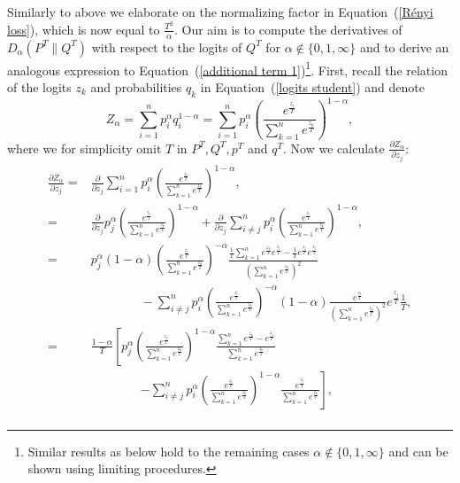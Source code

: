 \begin{rem}
    Similarly to above we elaborate on the normalizing factor in Equation~(\ref{Rényi loss}), which is now equal to $\frac{T^2}{\alpha}$. Our aim is to compute the derivatives of $D_{\alpha}(P^T \| Q^T)$ with respect to the logits of $Q^T$ for $\alpha\notin \lbrace 0,1,\infty\rbrace$ and to derive an analogous expression to Equation~(\ref{additional term 1})\footnote{Similar results as below hold to the remaining cases $\alpha\notin \lbrace 0,1,\infty\rbrace$ and can be shown using limiting procedures.}. First, recall the relation of the logits $z_k$ and probabilities $q_k$ in Equation~(\ref{logits student}) and denote
    \begin{equation*}
        Z_\alpha = \sum_{i=1}^{n} p_i^\alpha q_i ^{1-\alpha} = \sum_{i=1}^{n} p_i^\alpha \left( \frac{e^\frac{z_i}{T}}{\sum_{k=1}^n e^\frac{z_k}{T}} \right) ^{1-\alpha},
    \end{equation*}
    where we for simplicity omit $T$ in $P^T, Q^T, p^T$ and $q^T$. Now we calculate $\frac{\partial Z_\alpha}{\partial z_j}$:
\begin{align*}
	\frac{\partial Z_\alpha}{\partial z_j} =& \frac{\partial}{\partial z_j} \sum_{i=1}^{n} p_i^\alpha \left( \frac{e^\frac{z_i}{T}}{\sum_{k=1}^n e^\frac{z_k}{T}} \right) ^{1-\alpha}, \\
	=& \frac{\partial}{\partial z_j} p_j^\alpha \left( \frac{e^\frac{z_j}{T}}{\sum_{k=1}^n e^\frac{z_k}{T}} \right)^{1-\alpha} + \frac{\partial}{\partial z_j} \sum_{i\neq j}^{n} p_i^\alpha \left( \frac{e^\frac{z_i}{T}}{\sum_{k=1}^n e^\frac{z_k}{T}} \right) ^{1-\alpha}, \\
	=& p_j^\alpha (1-\alpha) \left( \frac{e^\frac{z_j}{T}}{\sum_{k=1}^n e^\frac{z_k}{T}} \right)^{-\alpha} \frac{\frac{1}{T} \sum_{k=1}^n e^\frac{z_k}{T} e^\frac{z_j}{T} - \frac{1}{T} e^\frac{z_j}{T} e^\frac{z_j}{T}}{(\sum_{k=1}^n e^\frac{z_k}{T})^2} \\
	& \qquad \qquad - \sum_{i\neq j}^{n} p_i^\alpha \left( \frac{e^\frac{z_i}{T}}{\sum_{k=1}^n e^\frac{z_k}{T}} \right)^{-\alpha} (1-\alpha) \frac{e^\frac{z_i}{T}}{(\sum_{k=1}^n e^\frac{z_k}{T})^2} e^\frac{z_j}{T} \frac{1}{T}, \\
	=& \frac{1-\alpha}{T} \left[ p_j^\alpha \left( \frac{e^\frac{z_j}{T}}{\sum_{k=1}^n e^\frac{z_k}{T}} \right)^{1-\alpha} \frac{\sum_{k=1}^n e^\frac{z_k}{T} - e^\frac{z_j}{T}}{\sum_{k=1}^n e^\frac{z_k}{T}} \right. \\
	& \qquad \qquad \left. - \sum_{i\neq j}^{n} p_i^\alpha \left( \frac{e^\frac{z_i}{T}}{\sum_{k=1}^n e^\frac{z_k}{T}} \right)^{1-\alpha} \frac{e^\frac{z_j}{T}}{\sum_{k=1}^n e^\frac{z_k}{T}} \right], \\

\end{align*}
\end{rem}
